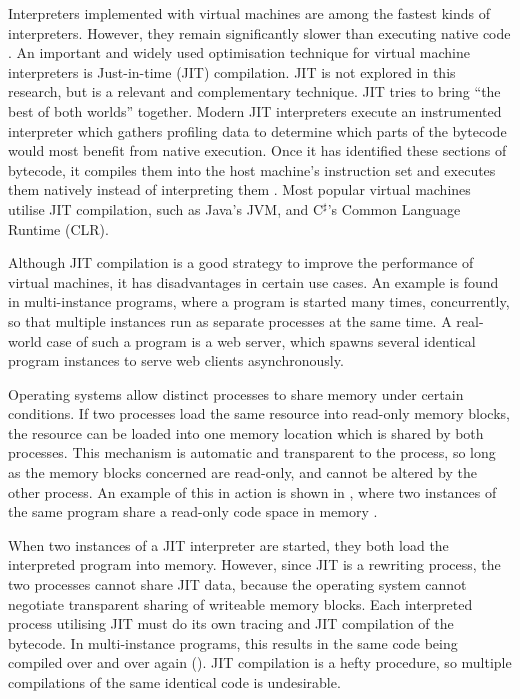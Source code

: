 		Interpreters implemented with virtual machines are among the fastest kinds of interpreters\citep{modernarchvm}. However, they remain significantly slower than executing native code \citep{optimizingindirectbranch}. An important and widely used optimisation technique for virtual machine interpreters is Just-in-time (JIT) compilation. JIT is not explored in this research, but is a relevant and complementary technique. JIT tries to bring ``the best of both worlds'' together. Modern JIT interpreters execute an instrumented interpreter which gathers profiling data to determine which parts of the bytecode would most benefit from native execution. Once it has identified these sections of bytecode, it compiles them into the host machine's instruction set and executes them natively instead of interpreting them \citep{historyjit}. Most popular virtual machines utilise JIT compilation, such as Java's JVM, and C$^\sharp$'s Common Language Runtime (CLR).
		
		Although JIT compilation is a good strategy to improve the performance of virtual machines, it has disadvantages in certain use cases. An example is found in multi-instance programs, where a program is started many times, concurrently, so that multiple instances run as separate processes at the same time. A real-world case of such a program is a  web server, which spawns several identical program instances to serve web clients asynchronously.
		
		Operating systems allow distinct processes to share memory under certain conditions. If two processes load the same resource into read-only memory blocks, the resource can be loaded into one memory location which is shared by both processes. This mechanism is automatic and transparent to the process, so long as the memory blocks concerned are read-only, and cannot be altered by the other process. An example of this in action is shown in , where two instances of the same program share a read-only code space in memory \citep{sharedcodepatent}. 
		
		When two instances of a JIT interpreter are started, they both load the interpreted program into memory. However, since JIT is a rewriting process, the two processes cannot share JIT data, because the operating system cannot negotiate transparent sharing of writeable memory blocks. Each interpreted process utilising JIT must do its own tracing and JIT compilation of the bytecode. In multi-instance programs, this results in the same code being compiled over and over again (). JIT compilation is a hefty procedure, so multiple compilations of the same identical code is undesirable. 
		
